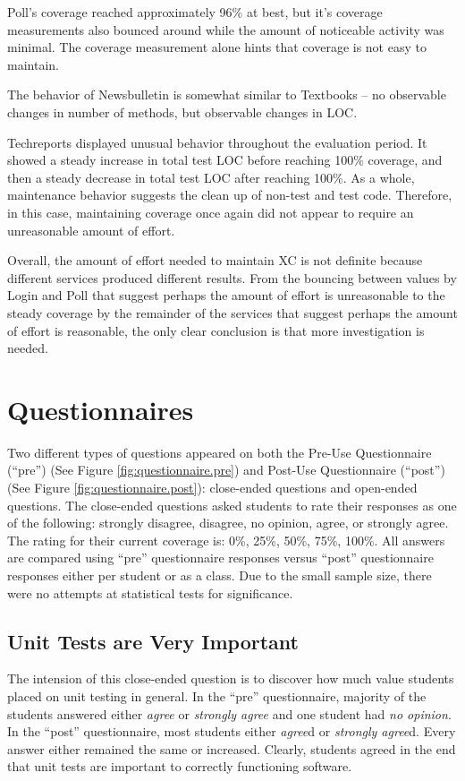 Poll's coverage reached approximately 96\% at best, but it's coverage
measurements also bounced around while the amount of noticeable activity was
minimal.  The coverage measurement alone hints that coverage is not easy to
maintain.

The behavior of Newsbulletin is somewhat similar to Textbooks -- no
observable changes in number of methods, but observable changes in LOC.

Techreports displayed unusual behavior throughout the evaluation period.
It showed a steady increase in total test LOC before reaching 100\%
coverage, and then a steady decrease in total test LOC after reaching
100\%.  As a whole, maintenance behavior suggests the clean up of non-test
and test code.  Therefore, in this case, maintaining coverage once again
did not appear to require an unreasonable amount of effort.

Overall, the amount of effort needed to maintain XC is not definite because
different services produced different results.  From the bouncing between
values by Login and Poll that suggest perhaps the amount of effort is
unreasonable to the steady coverage by the remainder of the services that
suggest perhaps the amount of effort is reasonable, the only clear
conclusion is that more investigation is needed.

\section{Questionnaires} \label{section.questionnaires}
Two different types of questions appeared on both the Pre-Use Questionnaire
(``pre'') (See Figure \ref{fig:questionnaire.pre}) and Post-Use
Questionnaire (``post'') (See Figure \ref{fig:questionnaire.post}):
close-ended questions and open-ended questions.  The close-ended questions
asked students to rate their responses as one of the following: strongly
disagree, disagree, no opinion, agree, or strongly agree.  The rating for
their current coverage is: 0\%, 25\%, 50\%, 75\%, 100\%.  All answers are
compared using ``pre'' questionnaire responses versus ``post''
questionnaire responses either per student or as a class.  Due to the small
sample size, there were no attempts at statistical tests for significance.

\subsection{Unit Tests are Very Important}
The intension of this close-ended question is to discover how much value
students placed on unit testing in general.  In the ``pre'' questionnaire,
majority of the students answered either {\sl agree} or {\sl strongly
agree} and one student had {\sl no opinion}.  In the ``post''
questionnaire, most students either {\sl agree}d or {\sl strongly agree}d.
Every answer either remained the same or increased.  Clearly, students
agreed in the end that unit tests are important to correctly functioning
software.

